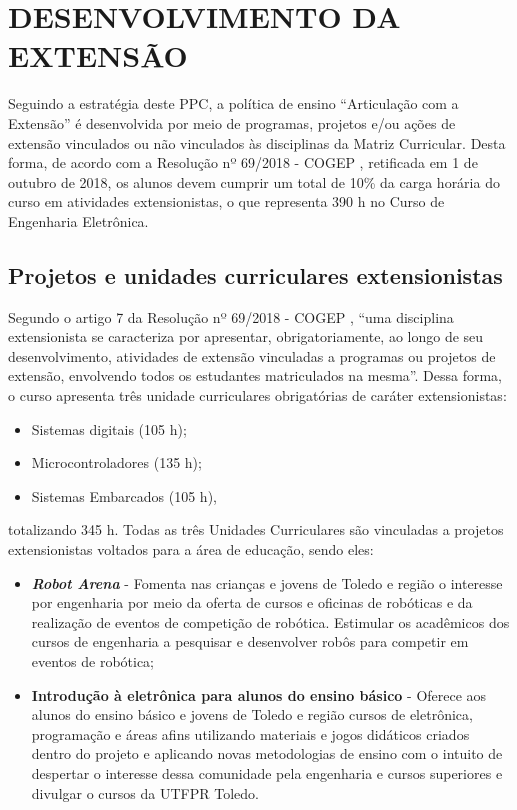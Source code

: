 \section{DESENVOLVIMENTO DA EXTENSÃO}

Seguindo a estratégia deste PPC, a política de ensino ``Articulação com a Extensão'' é desenvolvida por meio de programas, projetos e/ou ações de extensão vinculados ou não vinculados às disciplinas da Matriz Curricular. Desta forma, de acordo com a Resolução nº 69/2018 - COGEP \cite{cogep69}, retificada em 1\textordmasculine{} de outubro de 2018, os alunos devem cumprir um total de 10\% da carga horária do curso em atividades extensionistas, o que representa 390 h no Curso de Engenharia Eletrônica.

\subsection{Projetos e unidades curriculares extensionistas}

Segundo o artigo 7\textordmasculine{} da Resolução nº 69/2018 - COGEP \cite{cogep69}, ``uma disciplina extensionista se caracteriza por apresentar, obrigatoriamente, ao longo de seu desenvolvimento, atividades de extensão vinculadas a programas ou projetos de extensão, envolvendo todos os estudantes matriculados na mesma''. Dessa forma, o curso apresenta três unidade curriculares obrigatórias de caráter extensionistas:

\begin{itemize}
    \item Sistemas digitais (105 h);
    \item Microcontroladores (135 h);
    \item Sistemas Embarcados (105 h),
\end{itemize}

\noindent totalizando 345 h. Todas as três Unidades Curriculares são vinculadas a projetos extensionistas voltados para a área de educação, sendo eles:

\begin{itemize}
    \item \textbf{\textit{Robot Arena}} - Fomenta nas crianças e jovens de Toledo e região o interesse por engenharia por meio da oferta de cursos e oficinas de robóticas e da realização de eventos de competição de robótica. Estimular os acadêmicos dos cursos de engenharia a pesquisar e desenvolver robôs para competir em eventos de robótica;
    \item \textbf{Introdução à eletrônica para alunos do ensino básico} - Oferece aos alunos do ensino básico e jovens de Toledo e região cursos de eletrônica, programação e áreas afins utilizando materiais e jogos didáticos criados dentro do projeto e aplicando novas metodologias de ensino com o intuito de despertar o interesse dessa comunidade pela engenharia e cursos superiores e divulgar o cursos da UTFPR Toledo.
\end{itemize}

